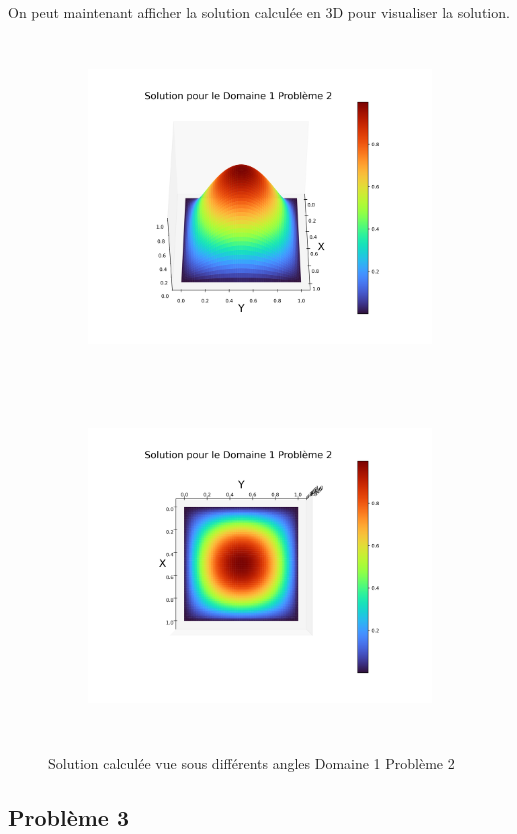 \documentclass[a4paper, 12pt, french]{report}
\begin{document}
On peut maintenant afficher la solution calculée en 3D pour visualiser la solution.
\begin{figure}[!h]
    \centering
    \begin{subfigure}{0.48\textwidth}
    	\centering
        \includegraphics[height=9cm]{../Images/Figures_Calculees/sol3D12.png}
    \end{subfigure}
    \begin{subfigure}{0.48\textwidth}
    \centering
        \includegraphics[height=9cm]{../Images/Figures_Calculees/sol3DVH12.png}
    \end{subfigure}
    \caption{Solution calculée vue sous différents angles Domaine 1 Problème 2 }
\end{figure}
\newpage
\subsection{Problème 3}
\end{document}
